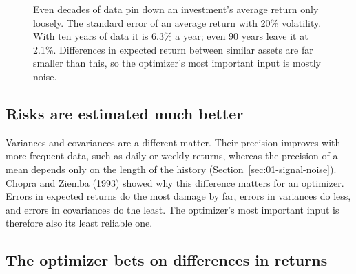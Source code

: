 \begin{figure}[htbp]
\centering
{}
\caption{Even decades of data pin down an investment's average return only loosely. The standard error of an average return with 20\% volatility. With ten years of data it is 6.3\% a year; even 90 years leave it at 2.1\%. Differences in expected return between similar assets are far smaller than this, so the optimizer's most important input is mostly noise.}
\label{fig:12-se}
\end{figure}

\subsection{Risks are estimated much better}

Variances and covariances are a different matter. Their precision improves with more frequent data, such as daily or weekly returns, whereas the precision of a mean depends only on the length of the history (Section~\ref{sec:01-signal-noise}). Chopra and Ziemba (1993) showed why this difference matters for an optimizer. Errors in expected returns do the most damage by far, errors in variances do less, and errors in covariances do the least. The optimizer's most important input is therefore also its least reliable one.

\subsection{The optimizer bets on differences in returns}
\label{sec:12-worked}

